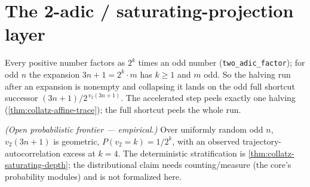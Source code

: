 \section{The 2-adic / saturating-projection layer}

\begin{theorem}
  \label{thm:collatz-saturating-depth}
  \leanok
  Every positive number factors as $2^k$ times an odd number
  (\texttt{two\_adic\_factor}); for odd $n$ the expansion $3n+1=2^k\cdot m$ has $k\ge1$ and $m$
  odd. So the halving run after an expansion is nonempty and collapsing it lands on the odd full
  shortcut successor $(3n+1)/2^{\,v_2(3n+1)}$. The accelerated step peels exactly one
  halving (\cref{thm:collatz-affine-trace}); the full shortcut peels the whole run.
\end{theorem}
\begin{theorem}
  \label{thm:collatz-v2-geometric}
  \notready
  \emph{(Open probabilistic frontier --- empirical.)} Over uniformly random odd $n$,
  $v_2(3n+1)$ is geometric, $P(v_2=k)=1/2^k$, with an observed trajectory-autocorrelation excess
  at $k=4$. The deterministic stratification is \cref{thm:collatz-saturating-depth}; the
  distributional claim needs counting/measure (the core's probability modules) and is not
  formalized here.
\end{theorem}

